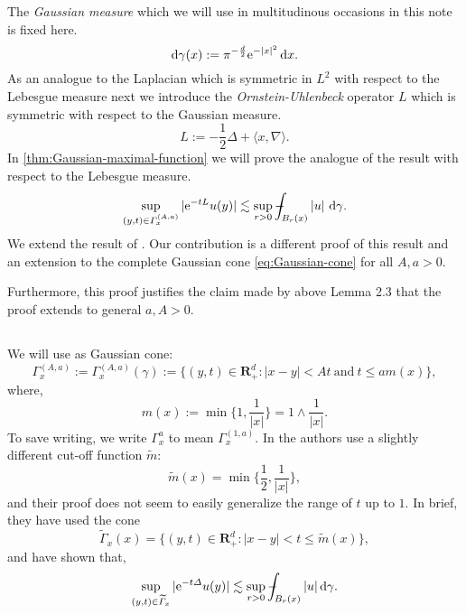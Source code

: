 \documentclass[a4paper,oneside,10pt]{amsproc}
\theoremstyle{plain}
\theoremstyle{remark}
\newcommand{\D}{\,\textup{d}}
\newcommand{\la}{\langle}
\newcommand{\ra}{\rangle}
\def\Xint#1{\mathchoice
  {\XXint\displaystyle\textstyle{#1}}%
  {\XXint\textstyle\scriptstyle{#1}}%
  {\XXint\scriptstyle\scriptscriptstyle{#1}}%
  {\XXint\scriptscriptstyle\scriptscriptstyle{#1}}%
  \!\int}
\def\XXint#1#2#3{{\setbox0=\hbox{$#1{#2#3}{\int}$ }
    \vcenter{\hbox{$#2#3$ }}\kern-.535\wd0}}
\def\dashint{\Xint-}
\renewcommand{\leq}{\leqslant}
\renewcommand{\leq}{\leqslant}
\newcommand{\R}{\mathbf R}
\newcommand{\e}{\mathrm{e}} %
\renewcommand{\leq}{\leqslant}%
\begin{document}
The \emph{Gaussian measure} which we will use in multitudinous
occasions in this note is fixed here.
\begin{equation}
  \label{eq:Gaussian-measure}
  \mathrm{d}\gamma(x) := \pi^{-\frac{d}2} \e^{-|x|^2} \D{x}.
\end{equation}
As an analogue to the Laplacian which is symmetric in $L^2$ with
respect to the Lebesgue measure next we introduce the
\emph{Ornstein-Uhlenbeck} operator $L$ which is symmetric with respect
to the Gaussian measure.
\begin{equation}
  \label{eq:Ornstein-Uhlenbeck-operator}
  L := -\frac12 \Delta + \la x, \nabla \ra.
\end{equation}
In \autoref{thm:Gaussian-maximal-function} we will prove the analogue
of the result with respect to the Lebesgue measure.
\begin{equation*}
  \sup_{(y, t) \in \Gamma_x^{(A, a)}} |\e^{-t L} u(y)| \lesssim
  \sup_{r > 0} \dashint_{B_r(x)} |u| \, \D\gamma.
\end{equation*}
We extend the result of \cite[Lemma~1.1]{Pineda2008}. Our contribution
is a different proof of this result and an extension to the complete
Gaussian cone \eqref{eq:Gaussian-cone} for all $A, a > 0$.

Furthermore, this proof justifies the claim made by \cite{Portal2012}
above Lemma 2.3 that the proof extends to general $a, A > 0$. 

\subsection{\Textcite{Pineda2008}}
We will use as Gaussian cone:
\begin{equation}
  \label{eq:Gaussian-cone}
  \Gamma_x^{(A, a)} := \Gamma_x^{(A, a)}(\gamma) := \{(y, t) \in
  \R^d_+ : |x - y| < At \:\text{and}\: t \leq a m(x)\},
\end{equation}
where,
\begin{equation}\label{eq:m-function}
  m(x) := \min\biggl\{1, \frac1{|x|} \biggr\} = 1 \wedge \frac1{|x|}.
\end{equation}
To save writing, we write $\Gamma_x^a$ to mean $\Gamma_x^{(1,
  a)}$.
In \cite{Pineda2008} the authors use a slightly different cut-off
function $\widetilde{m}$:
\begin{equation*}
  \widetilde{m}(x) = \min\biggl\{\frac12, \frac1{|x|}\biggr\},
\end{equation*}
and their proof does not seem to easily generalize the range of $t$ up
to $1$.
In brief, they have used the cone
\begin{equation*}
   \widetilde{\Gamma}_x(x) = \{(y, t) \in \R^d_+ : |x - y| < t \leq
   \widetilde{m}(x)\},
\end{equation*}
and have shown that,
\begin{equation*}
  \sup_{(y, t) \in \widetilde{\Gamma}_x} |\e^{-t \Delta} u(y)|
  \lesssim \sup_{r > 0}  \dashint_{B_r(x)} |u| \D\gamma.
\end{equation*}
\end{document}
